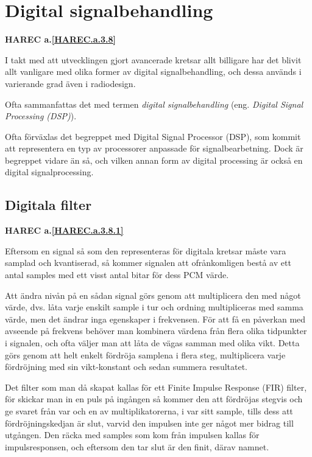 \section{Digital signalbehandling}
\textbf{HAREC a.\ref{HAREC.a.3.8}\label{myHAREC.a.3.8}}

I takt med att utvecklingen gjort avancerade kretsar allt billigare har det
blivit allt vanligare med olika former av digital signalbehandling, och dessa
används i varierande grad även i radiodesign.

Ofta sammanfattas det med termen \emph{digital signalbehandling} (eng.
\emph{Digital Signal Processing (DSP)}).

Ofta förväxlas det begreppet med Digital Signal Processor (DSP), som kommit att
representera en typ av processorer anpassade för signalbearbetning.
Dock är begreppet vidare än så, och vilken annan form av digital processing är
också en digital signalprocessing.

\subsection{Digitala filter}
\textbf{HAREC a.\ref{HAREC.a.3.8.1}\label{myHAREC.a.3.8.1}}
\label{digitala filter}

Eftersom en signal så som den representeras för digitala kretsar måste vara
samplad och kvantiserad, så kommer signalen att ofrånkomligen bestå av ett
antal samples med ett visst antal bitar för dess PCM värde.

Att ändra nivån på en sådan signal görs genom att multiplicera den med något
värde, dvs. låta varje enskilt sample i tur och ordning multipliceras med
samma värde, men det ändrar inga egenskaper i frekvensen.
För att få en påverkan med avseende på frekvens behöver man kombinera värdena
från flera olika tidpunkter i signalen, och ofta väljer man att låta de
vägas samman med olika vikt.
Detta görs genom att helt enkelt fördröja samplena i flera steg,
multiplicera varje fördröjning med sin vikt-konstant och sedan summera
resultatet.

Det filter som man då skapat kallas för ett Finite Impulse Response (FIR)
filter, för skickar man in en puls på ingången så kommer den att fördröjas
stegvis och ge svaret från var och en av multiplikatorerna, i var sitt sample,
tills dess att fördröjningskedjan är slut, varvid den impulsen inte ger något
mer bidrag till utgången.
Den räcka med samples som kom från impulsen kallas för impulsresponsen, och
eftersom den tar slut är den finit, därav namnet.

